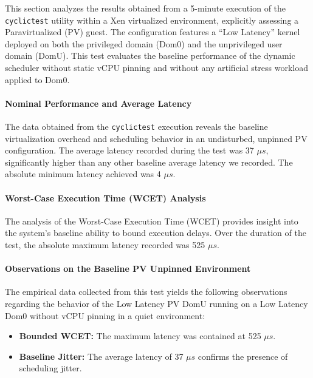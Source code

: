 This section analyzes the results obtained from a 5-minute execution of
the \texttt{cyclictest} utility within a Xen virtualized environment,
explicitly assessing a Paravirtualized (PV) guest. The configuration
features a ``Low Latency'' kernel deployed on both the privileged domain
(Dom0) and the unprivileged user domain (DomU). This test evaluates the
baseline performance of the dynamic scheduler without static vCPU
pinning and without any artificial stress workload applied to Dom0.

\paragraph{Nominal Performance and Average
Latency}\label{nominal-performance-and-average-latency-23}

The data obtained from the \texttt{cyclictest} execution reveals the
baseline virtualization overhead and scheduling behavior in an
undisturbed, unpinned PV configuration. The average latency recorded
during the test was 37 $\mu s$, significantly higher than any other baseline
average latency we recorded. The absolute minimum latency achieved was 4
$\mu s$.

\paragraph{Worst-Case Execution Time (WCET)
Analysis}\label{worst-case-execution-time-wcet-analysis-25}

The analysis of the Worst-Case Execution Time (WCET) provides insight
into the system's baseline ability to bound execution delays. Over the
duration of the test, the absolute maximum latency recorded was 525 $\mu s$.

\paragraph{Observations on the Baseline PV Unpinned
Environment}\label{observations-on-the-baseline-pv-unpinned-environment}

The empirical data collected from this test yields the following
observations regarding the behavior of the Low Latency PV DomU running
on a Low Latency Dom0 without vCPU pinning in a quiet environment:

\begin{itemize}
\item
  \textbf{Bounded WCET:} The maximum latency was contained at 525 $\mu s$.
\item
  \textbf{Baseline Jitter:} The average latency of 37 $\mu s$ confirms the
  presence of scheduling jitter.
\end{itemize}

